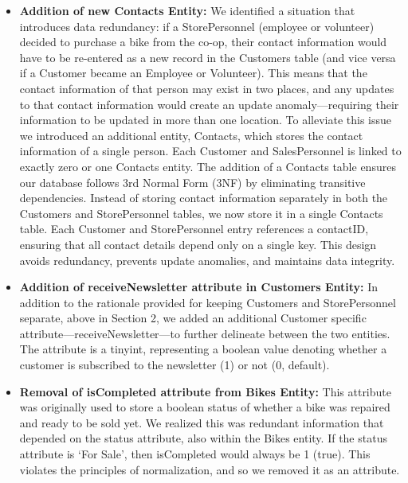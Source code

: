 \documentclass{article}
\begin{document}
\begin{tcolorbox}[colback=secondarycolor, colframe=primarycolor, arc=5mm, title=\textbf{Step 1 --> Step 2}]
 \vspace{0.2cm}
\begin{itemize}
  \item \textbf{Addition of new Contacts Entity:} We identified a situation that introduces data redundancy: if a StorePersonnel (employee or volunteer) decided to purchase a bike from the co-op, their contact information would have to be re-entered as a new record in the Customers table (and vice versa if a Customer became an Employee or Volunteer). This means that the contact information of that person may exist in two places, and any updates to that contact information would create an update anomaly---requiring their information to be updated in more than one location. To alleviate this issue we introduced an additional entity, Contacts, which stores the contact information of a single person. Each Customer and SalesPersonnel is linked to exactly zero or one Contacts entity. The addition of a Contacts table ensures our database follows 3rd Normal Form (3NF) by eliminating transitive dependencies. Instead of storing contact information separately in both the Customers and StorePersonnel tables, we now store it in a single Contacts table. Each Customer and StorePersonnel entry references a contactID, ensuring that all contact details depend only on a single key. This design avoids redundancy, prevents update anomalies, and maintains data integrity.
  \vspace{0.1cm}
  \item \textbf{Addition of receiveNewsletter attribute in Customers Entity:} In addition to the rationale provided for keeping Customers and StorePersonnel separate, above in Section 2, we added an additional Customer specific attribute---receiveNewsletter---to further delineate between the two entities. The attribute is a tinyint, representing a boolean value denoting whether a customer is subscribed to the newsletter (1) or not (0, default).
  \vspace{0.1cm}
   \item \textbf{Removal of isCompleted attribute from Bikes Entity:} This attribute was originally used to store a boolean status of whether a bike was repaired and ready to be sold yet. We realized this was redundant information that depended on the status attribute, also within the Bikes entity. If the status attribute is `For Sale', then isCompleted would always be 1 (true). This violates the principles of normalization, and so we removed it as an attribute.
\end{itemize}

\end{tcolorbox}
\end{document}
